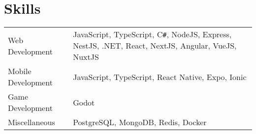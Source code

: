 \documentclass[a4paper,12pt]{article}
\begin{document}
\section{Skills}
\begin{tabularx}{\linewidth}{@{}l X@{}}
Web Development & \normalsize{JavaScript, TypeScript, C{\texttt{\#}}, NodeJS, Express, NestJS, .NET, React, NextJS, Angular, VueJS, NuxtJS}\\
Mobile Development & \normalsize{JavaScript, TypeScript, React Native, Expo, Ionic}\\
Game Development & \normalsize{Godot}\\
Miscellaneous  &  \normalsize{PostgreSQL, MongoDB, Redis, Docker}\\  
\end{tabularx}

\vfill
{}
\end{document}
